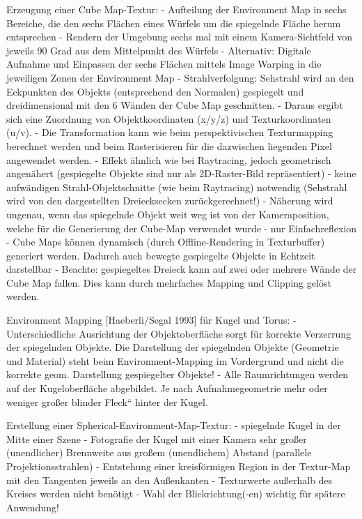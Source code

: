 \documentclass[10pt,landscape]{article}
\begin{document}
\begin{multicols}{3}
Erzeugung einer Cube Map-Textur:
- Aufteilung der Environment Map in sechs Bereiche, die den sechs Flächen eines Würfels um die spiegelnde Fläche herum entsprechen
- Rendern der Umgebung sechs mal mit einem Kamera-Sichtfeld von jeweils 90 Grad aus dem Mittelpunkt des Würfels
- Alternativ: Digitale Aufnahme und Einpassen der sechs Flächen mittels Image Warping in die jeweiligen Zonen der Environment Map
- Strahlverfolgung: Sehstrahl wird an den Eckpunkten des Objekts (entsprechend den Normalen) gespiegelt und dreidimensional mit den 6 Wänden der Cube Map geschnitten.
- Daraus ergibt sich eine Zuordnung von Objektkoordinaten (x/y/z) und Texturkoordinaten (u/v). 
- Die Transformation kann wie beim perspektivischen Texturmapping berechnet werden und beim Rasterisieren für die dazwischen liegenden Pixel angewendet werden.
- Effekt ähnlich wie bei Raytracing, jedoch geometrisch angenähert (gespiegelte Objekte sind nur als 2D-Raster-Bild repräsentiert)
- keine aufwändigen Strahl-Objektschnitte (wie beim Raytracing) notwendig (Sehstrahl wird von den dargestellten Dreiecksecken zurückgerechnet!)
- Näherung wird ungenau, wenn das spiegelnde Objekt weit weg ist von der Kameraposition, welche für die Generierung der Cube-Map verwendet wurde
- nur Einfachreflexion
- Cube Maps können dynamisch (durch Offline-Rendering in Texturbuffer) generiert werden. Dadurch auch bewegte gespiegelte Objekte in Echtzeit darstellbar
- Beachte: gespiegeltes Dreieck kann auf zwei oder mehrere Wände der Cube Map fallen. Dies kann durch mehrfaches Mapping und Clipping gelöst werden.

Environment Mapping [Haeberli/Segal 1993] für Kugel und Torus: 
- Unterschiedliche Ausrichtung der Objektoberfläche sorgt für korrekte Verzerrung der spiegelnden Objekte. Die Darstellung der spiegelnden Objekte (Geometrie und Material) steht beim Environment-Mapping im Vordergrund und nicht die korrekte geom. Darstellung gespiegelter Objekte!
- Alle Raumrichtungen werden auf der Kugeloberfläche abgebildet. Je nach Aufnahmegeometrie mehr oder weniger großer blinder Fleck“ hinter der Kugel.


Erstellung einer Spherical-Environment-Map-Textur:
- spiegelnde Kugel in der Mitte einer Szene
- Fotografie der Kugel mit einer Kamera sehr großer (unendlicher) Brennweite aus großem (unendlichem) Abstand (parallele Projektionsstrahlen)
- Entstehung einer kreisförmigen Region in der Textur-Map mit den Tangenten jeweils an den Außenkanten
- Texturwerte außerhalb des Kreises werden nicht benötigt
- Wahl der Blickrichtung(-en) wichtig für spätere Anwendung!


\end{multicols}
\end{document}
